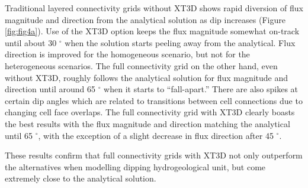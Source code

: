 \documentclass{article}
\begin{document}
Traditional layered connectivity grids without XT3D shows rapid diversion of flux magnitude and direction from the analytical solution as dip increases (Figure \ref{fig:fig4a}). Use of the XT3D option keeps the flux magnitude somewhat on-track until about 30 $^{\circ}$ when the solution starts peeling away from the analytical. Flux direction is improved for the homogeneous scenario, but not for the heterogeneous scenarios. The full connectivity grid on the other hand, even without XT3D, roughly follows the analytical solution for flux magnitude and direction until around 65 $^{\circ}$ when it starts to ``fall-apart.'' There are also spikes at certain dip angles which are related to transitions between cell connections due to changing cell face overlaps. The full connectivity grid with XT3D clearly boasts the best results with the flux magnitude and direction matching the analytical until 65 $^{\circ}$, with the exception of a slight decrease in flux direction after 45 $^{\circ}$.

These results confirm that full connectivity grids with XT3D not only outperform the alternatives when modelling dipping hydrogeological unit, but come extremely close to the analytical solution.
\end{document}

